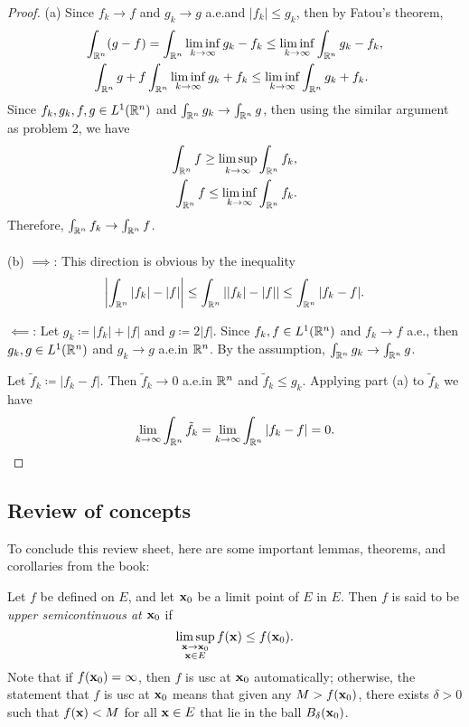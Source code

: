 \begin{proof}
(a) Since $f_k\to f$ and $g_k\to g$ a.e.\@ and $|f_k|\leq g_k$, then by
Fatou's theorem,
\begin{align*}
\int_{\mathbb{R}^n}(g-f)
&=\int_{\mathbb{R}^n}\liminf_{k\to\infty} g_k-f_k
\leq\liminf_{k\to\infty}\int_{\mathbb{R}^n}g_k-f_k,\\
\int_{\mathbb{R}^n}g+f&\int_{\mathbb{R}^n}\liminf_{k\to\infty}g_k+f_k\leq\liminf_{k\to\infty}\int_{\mathbb{R}^n}g_k+f_k.
\end{align*}
Since $f_k,g_k,f,g\in L^1(\mathbb{R}^n)$ and $\int_{\mathbb{R}^n}g_k\to\int_{\mathbb{R}^n}g$,
then using the similar argument as problem 2, we have
\[
  \begin{aligned}
   \int_{\mathbb{R}^n}f\geq\limsup_{k\to\infty}\int_{\mathbb{R}^n}f_k,\\
   \int_{\mathbb{R}^n}f\leq\liminf_{k\to\infty}\int_{\mathbb{R}^n} f_k.
  \end{aligned}
\]
Therefore, $\int_{\mathbb{R}^n}f_k\to\int_{\mathbb{R}^n} f$.
\\\\
(b) $\implies$: This direction is obvious by the inequality
\[
\left|\int_{\mathbb{R}^n}|f_k|-|f|\right|\leq\int_{\mathbb{R}^n}\left||f_k|-|f|\right|\leq\int_{\mathbb{R}^n}|f_k-f|.
\]

$\impliedby$: Let $g_k\coloneqq |f_k|+|f|$ and $g\coloneqq 2|f|$. Since
$f_k,f\in L^1(\mathbb{R}^n)$ and $f_k\to f$ a.e., then $g_k,g\in L^1(\mathbb{R}^n)$ and
$g_k\to g$ a.e.\@ in $\mathbb{R}^n$. By the assumption, $\int_{\mathbb{R}^n}
g_k\to\int_{\mathbb{R}^n}g$.

Let $\tilde f_k\coloneqq|f_k-f|$. Then $\tilde f_k\to 0$ a.e.\@ in $\mathbb{R}^n$
and $\tilde f_k\leq g_k$. Applying part (a) to $\tilde f_k$ we have
\[
\lim_{k\to\infty}\int_{\mathbb{R}^n}\tilde f_k=\lim_{k\to\infty}\int_{\mathbb{R}^n}|f_k-f|=0.
\]
\end{proof}
\subsection{Review of concepts}
To conclude this review sheet, here are some important lemmas, theorems,
and corollaries from the book:

Let $f$ be defined on $E$, and let $\mathbf{x}_0$ be a limit point of $E$ in
$E$. Then $f$ is said to be \emph{upper semicontinuous at $\mathbf{x}_0$} if
\begin{equation}
  \label{eq:upper-semicontinuous}
\limsup_{\substack{\mathbf{x}\to\mathbf{x}_0\\\mathbf{x}\in E}}f(\mathbf{x})\leq f(\mathbf{x}_0).
\end{equation}
Note that if $f(\mathbf{x}_0)=\infty$, then $f$ is usc at $\mathbf{x}_0$
automatically; otherwise, the statement that $f$ is usc at $\mathbf{x}_0$ means
that given any $M>f(\mathbf{x}_0)$, there exists $\delta>0$ such that $f(\mathbf{x})<M$
for all $\mathbf{x}\in E$ that lie in the ball $B_\delta(\mathbf{x}_0)$.

